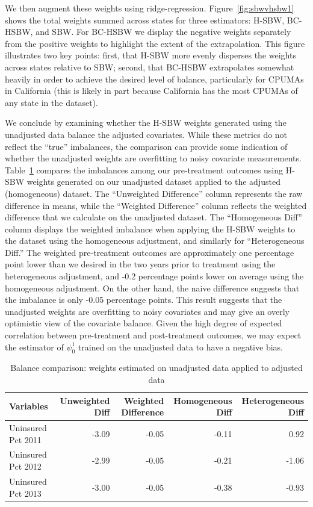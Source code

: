 \documentclass[aoas]{imsart}
\theoremstyle{plain}
\theoremstyle{remark}
\begin{document}
We then augment these weights using ridge-regression. Figure~\ref{fig:sbwvhsbw1} shows the total weights summed across states for three estimators: H-SBW, BC-HSBW, and SBW. For BC-HSBW we display the negative weights separately from the positive weights to highlight the extent of the extrapolation. This figure illustrates two key points: first, that H-SBW more evenly disperses the weights across states relative to SBW; second, that BC-HSBW extrapolates somewhat heavily in order to achieve the desired level of balance, particularly for CPUMAs in California (this is likely in part because California has the most CPUMAs of any state in the dataset).

We conclude by examining whether the H-SBW weights generated using the unadjusted data balance the adjusted covariates. While these metrics do not reflect the ``true'' imbalances, the comparison can provide some indication of whether the unadjusted weights are overfitting to noisy covariate measurements. Table~\ref{tab:balcomp} compares the imbalances among our pre-treatment outcomes using H-SBW weights generated on our unadjusted dataset applied to the adjusted (homogeneous) dataset. The ``Unweighted Difference'' column represents the raw difference in means, while the ``Weighted Difference'' column reflects the weighted difference that we calculate on the unadjusted dataset. The ``Homogeneous Diff'' column displays the weighted imbalance when applying the H-SBW weights to the dataset using the homogeneous adjustment, and similarly for ``Heterogeneous Diff.'' The weighted pre-treatment outcomes are approximately one percentage point lower than we desired in the two years prior to treatment using the heterogeneous adjustment, and -0.2 percentage points lower on average using the homogeneous adjustment. On the other hand, the naive difference suggests that the imbalance is only -0.05 percentage points. This result suggests that the unadjusted weights are overfitting to noisy covariates and may give an overly optimistic view of the covariate balance. Given the high degree of expected correlation between pre-treatment and post-treatment outcomes, we may expect the estimator of $\psi^1_0$ trained on the unadjusted data to have a negative bias.

\begin{table}[ht]
\caption{Balance comparison: weights estimated on unadjusted data applied to adjusted data}\label{tab:balcomp}
\begin{tabular}{lrrrr}
  \hline
Variables & Unweighted Diff & Weighted Difference & Homogeneous Diff & Heterogeneous Diff\\ 
  \hline
Uninsured Pct 2011 & -3.09 & -0.05 & -0.11 & 0.92 \\ 
  Uninsured Pct 2012 & -2.99 & -0.05 & -0.21 & -1.06 \\ 
  Uninsured Pct 2013 & -3.00 & -0.05 & -0.38 & -0.93 \\
   \hline
\end{tabular}
\end{table}
\end{document}
